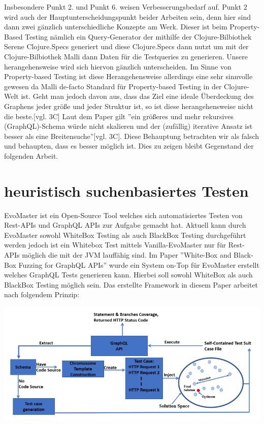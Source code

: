 Insbesondere Punkt 2. und Punkt 6. weisen Verbesserungsbedarf auf.
Punkt 2 wird auch der Hauptunterscheidungspunkt beider Arbeiten sein, denn hier sind dann zwei gänzlich unterschiedliche Konzepte am Werk.
Dieser ist beim Property-Based Testing nämlich ein Query-Generator der mithilfe der Clojure-Bilbiothek Serene\cite{clojureserene}
Clojure.Specs\cite{clojurespec} generiert und diese Clojure.Specs\cite{clojurespec} dann nutzt um mit der Clojure-Bilbiothek Malli\cite{clojuremalli} dann Daten für die Testqueries zu generieren.
Unsere herangehensweise wird sich hiervon gänzlich unterscheiden.
Im Sinne von Property-based Testing ist diese Herangehensweise allerdings eine sehr sinnvolle gewesen da Malli\cite{clojuremalli} de-facto Standard
für Property-based Testing in der Clojure-Welt ist.
Geht man jedoch davon aus, dass das Ziel eine ideale Überdeckung des Graphens jeder größe und jeder Struktur ist, so
ist diese herangehensweise nicht die beste.\cite{property-based-testing}[vgl. 3C]
Laut dem Paper gilt ''ein größeres und mehr rekursives (GraphQL)-Schema würde nicht skalieren und der (zufällig) iterative Ansatz ist besser als eine Breitensuche''\cite{property-based-testing}[vgl. 3C].
Diese Behauptung betrachten wir als falsch und behaupten, dass es besser möglich ist.
Dies zu zeigen bleibt Gegenstand der folgenden Arbeit.


\section{heuristisch suchenbasiertes Testen}

EvoMaster\cite{evo-master} ist ein Open-Source Tool welches sich automatisiertes Testen von Rest-APIs und GraphQL APIs zur Aufgabe gemacht hat.
Aktuell kann durch EvoMaster sowohl WhiteBox Testing als auch BlackBox Testing durchgeführt werden jedoch ist ein
Whitebox Test mittels Vanilla-EvoMaster nur für Rest-APIs möglich die mit der JVM lauffähig sind.
Im Paper ''White-Box and Black-Box Fuzzing for GraphQL APIs''\cite{belhadi2022whitebox} wurde ein System on-Top für EvoMaster
erstellt welches GraphQL Tests generieren kann.
Hierbei soll sowohl WhiteBox als auch BlackBox Testing möglich sein.
Das erstellte Framework in diesem Paper arbeitet nach folgendem Prinzip:

\begin{center}
    \includegraphics[width=\textwidth,height=\textheight,keepaspectratio]{content/hauptteil/related Work/evomaster_framework}
\end{center}

